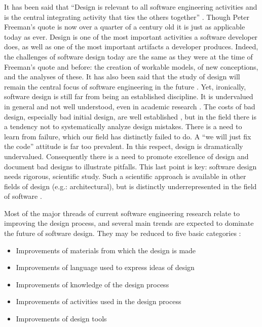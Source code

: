 \documentclass[letterpaper,10pt]{article}
\begin{document}
        It has been said that ``Design is relevant to all software
        engineering activities and is the central integrating activity
        that ties the others together'' \cite{freeman}.  Though Peter
        Freeman's quote is now over a quarter of a century old it is
        just as applicable today as ever.  Design is one of the most
        important activities a software developer does, as well as one
        of the most important artifacts a developer produces.  Indeed,
        the challenges of software design today are the same as they
        were at the time of Freeman's quote and before: the creation
        of workable models, of new conceptions, and the analyses of
        these.  It has also been said that the study of design will
        remain the central focus of software engineering in the future
        \cite{simon,taylor_hoek}.  Yet, ironically, software design is
        still far from being an established discipline.  It is
        undervalued in general and not well understood, even in
        academic research \cite{taylor_hoek}.  The costs of bad
        design, especially bad initial design, are well established
        \cite{bowen_hinchey}, but in the field there is a tendency not
        to systematically analyze design mistakes.  There is a need to
        learn from failure, which our field has distinctly failed to
        do.  A ``we will just fix the code'' attitude is far too
        prevalent.  In this respect, design is dramatically
        undervalued.  Consequently there is a need to promote
        excellence of design and document bad designs to illustrate
        pitfalls.  This last point is key: software design needs
        rigorous, scientific study.  Such a scientific approach is
        available in other fields of design (e.g.: architectural), but
        is distinctly underrepresented in the field of software
        \cite{taylor_hoek}.

        Most of the major threads of current software engineering
        research relate to improving the design process, and several
        main trends are expected to dominate the future of software
        design.  They may be reduced to five basic categories
        \cite{taylor_hoek}:

        \begin{itemize}
        \item Improvements of materials from which the design is made
        \item Improvements of language used to express ideas of design
        \item Improvements of knowledge of the design process
        \item Improvements of activities used in the design process
        \item Improvements of design tools 
        \end{itemize}
        
\end{document}

